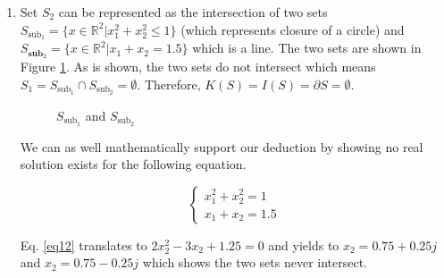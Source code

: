 \begin{enumerate}[label=(\alph*)]
\item Set $S_2$ can be represented as the intersection of two sets $S_{\text{sub}_1} = \{x \in \mathbb{R}^2 | x_1^2 + x_2^2 \leqslant 1 \}$ (which represents closure of a circle) and $S_{\textbf{sub}_2} = \{x \in \mathbb{R}^2 | x_1 + x_2 = 1.5\}$ which is a line. The two sets are shown in Figure \ref{fig12}. As is shown, the two sets do not intersect which means $S_1 = S_{\text{sub}_1} \cap S_{\text{sub}_2} = \emptyset$. Therefore, $K(S) = I(S) = \partial S = \emptyset$.

\begin{figure}[H]\centering
{}
\caption{$S_{\text{sub}_1}$ and $S_{\text{sub}_2}$}\label{fig12}
\end{figure}

We can as well mathematically support our deduction by showing no real solution exists for the following equation.

\begin{equation}
\left\{ \begin{array}{ll} x_1^2 + x_2^2 = 1 \\ x_1 + x_2 = 1.5 \end{array} \right.
\label{eq12}
\end{equation}

Eq. \ref{eq12} translates to $2x_2^2 - 3x_2 + 1.25 = 0$ and yields to $x_2 = 0.75 + 0.25j$ and $x_2 = 0.75 - 0.25j$ which shows the two sets never intersect.

\end{enumerate}
